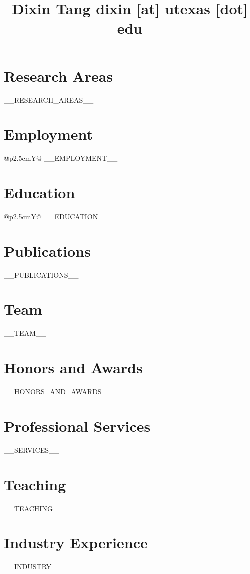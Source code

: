 \documentclass[10pt]{article}
\begin{document}
\title{Dixin Tang {\small dixin [at] utexas [dot] edu}}
\vspace{-5mm}

\section{Research Areas}

__RESEARCH_AREAS__

\vspace{-5mm}

\section{Employment}

\begin{tabularx}{\textwidth}{@{}p{2.5cm}Y@{}}
__EMPLOYMENT__
\end{tabularx}

\vspace{-5mm}

\section{Education}

\begin{tabularx}{\textwidth}{@{}p{2.5cm}Y@{}}
__EDUCATION__
\end{tabularx}

\vspace{-5mm}

\section{Publications}
\begin{cvpublist}
__PUBLICATIONS__
\end{cvpublist}

\vspace{-5mm}

\section{Team}
__TEAM__
\vspace{-5mm}

\section{Honors and Awards}
\begin{cvitemize}
__HONORS_AND_AWARDS__
\end{cvitemize}
\vspace{-5mm}

\section{Professional Services}
__SERVICES__
\vspace{-5mm}

\section{Teaching}

__TEACHING__
\vspace{-5mm}

\section{Industry Experience}
__INDUSTRY__

\vspace{-5mm}
\end{document}

